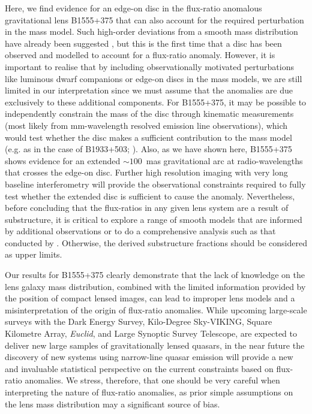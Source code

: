 \documentclass[a4paper,fleqn,usenatbib,useAMS]{mnras}
\begin{document}
Here, we find evidence for an edge-on disc in the flux-ratio anomalous gravitational lens B1555+375 that can also account for the required perturbation in the mass model. Such high-order deviations from a smooth mass distribution have already been suggested \citep{evans03,congdon05}, but this is the first time that a disc has been observed and modelled to account for a flux-ratio anomaly. However, it is important to realise that by including observationally motivated perturbations like luminous dwarf companions or edge-on discs in the mass models, we are still limited in our interpretation since we must assume that the anomalies are due exclusively to these additional components. For B1555+375, it may be possible to independently constrain the mass of the disc through kinematic measurements (most likely from mm-wavelength resolved emission line observations), which would test whether the disc makes a sufficient contribution to the mass model (e.g. as in the case of B1933+503; \citealt{suyu12}). Also, as we have shown here, B1555+375 shows evidence for an extended $\sim100$~mas gravitational arc at radio-wavelengths that crosses the edge-on disc. Further high resolution imaging with very long baseline interferometry will provide the observational constraints required to fully test whether the extended disc is sufficient to cause the anomaly. Nevertheless, before concluding that the flux-ratios in any given lens system are a result of substructure, it is critical to explore a range of smooth models that are informed by additional observations or to do a comprehensive analysis such as that conducted by \citet{Xu15}. Otherwise, the derived substructure fractions should be considered as upper limits.
 
Our results for B1555+375 clearly demonstrate that the lack of knowledge on the lens galaxy mass distribution, combined with the limited information provided by the position of compact lensed images, can lead to improper lens models and a misinterpretation of the origin of flux-ratio anomalies. While upcoming large-scale surveys with the Dark Energy Survey, Kilo-Degree Sky-VIKING, Square Kilometre Array, {\it Euclid}, and Large Synoptic Survey Telescope, are expected to deliver new large samples of gravitationally lensed quasars, in the near future the discovery of new systems using narrow-line quasar emission \citep{N14} will provide a new and invaluable statistical perspective on the current constraints based on flux-ratio anomalies. We stress, therefore, that one should be very careful when interpreting the nature of flux-ratio anomalies, as prior simple assumptions on the lens mass distribution may a significant source of bias. 
\end{document}

